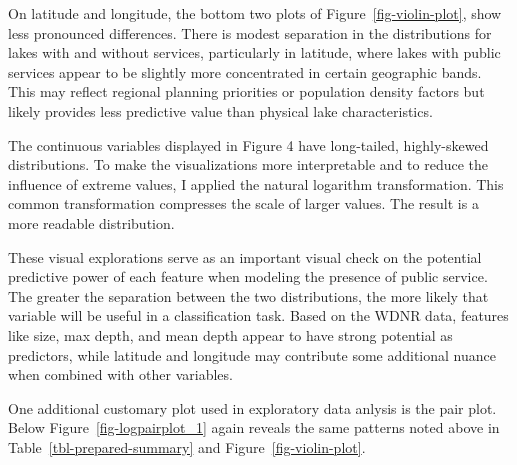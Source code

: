 \documentclass[
]{article}
\begin{document}
On latitude and longitude, the bottom two plots of
Figure~\ref{fig-violin-plot}, show less pronounced differences. There is
modest separation in the distributions for lakes with and without
services, particularly in latitude, where lakes with public services
appear to be slightly more concentrated in certain geographic bands.
This may reflect regional planning priorities or population density
factors but likely provides less predictive value than physical lake
characteristics.

\begin{tcolorbox}[enhanced jigsaw, coltitle=black, toprule=.15mm, arc=.35mm, bottomtitle=1mm, opacityback=0, leftrule=.75mm, left=2mm, colframe=quarto-callout-note-color-frame, toptitle=1mm, titlerule=0mm, breakable, colbacktitle=quarto-callout-note-color!10!white, colback=white, bottomrule=.15mm, title=\textcolor{quarto-callout-note-color}{\faInfo}\hspace{0.5em}{Note}, rightrule=.15mm, opacitybacktitle=0.6]

The continuous variables displayed in Figure 4 have long-tailed,
highly-skewed distributions. To make the visualizations more
interpretable and to reduce the influence of extreme values, I applied
the natural logarithm transformation. This common transformation
compresses the scale of larger values. The result is a more readable
distribution.

\end{tcolorbox}

These visual explorations serve as an important visual check on the
potential predictive power of each feature when modeling the presence of
public service. The greater the separation between the two
distributions, the more likely that variable will be useful in a
classification task. Based on the WDNR data, features like size, max
depth, and mean depth appear to have strong potential as predictors,
while latitude and longitude may contribute some additional nuance when
combined with other variables.

One additional customary plot used in exploratory data anlysis is the
pair plot. Below Figure~\ref{fig-logpairplot_1} again reveals the same
patterns noted above in Table~\ref{tbl-prepared-summary} and
Figure~\ref{fig-violin-plot}.
\end{document}
